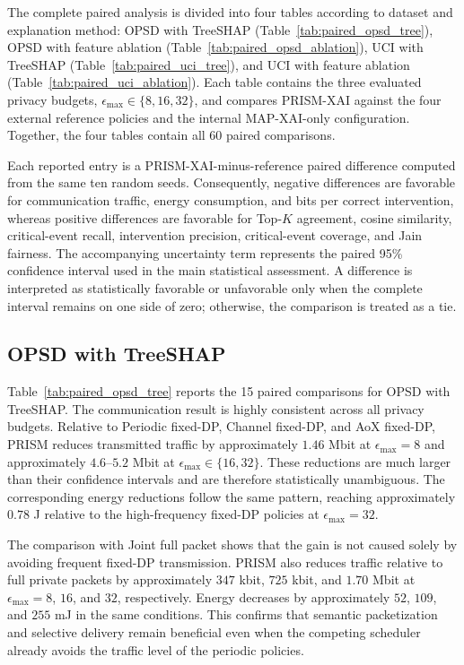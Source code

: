 \documentclass[11pt]{article}
\begin{document}
The complete paired analysis is divided into four tables according to dataset and explanation method: OPSD with TreeSHAP (Table~\ref{tab:paired_opsd_tree}), OPSD with feature ablation (Table~\ref{tab:paired_opsd_ablation}), UCI with TreeSHAP (Table~\ref{tab:paired_uci_tree}), and UCI with feature ablation (Table~\ref{tab:paired_uci_ablation}). Each table contains the three evaluated privacy budgets, $\epsilon_{\max}\in\{8,16,32\}$, and compares PRISM-XAI against the four external reference policies and the internal MAP-XAI-only configuration. Together, the four tables contain all 60 paired comparisons.

Each reported entry is a PRISM-XAI-minus-reference paired difference computed from the same ten random seeds. Consequently, negative differences are favorable for communication traffic, energy consumption, and bits per correct intervention, whereas positive differences are favorable for Top-$K$ agreement, cosine similarity, critical-event recall, intervention precision, critical-event coverage, and Jain fairness. The accompanying uncertainty term represents the paired 95\% confidence interval used in the main statistical assessment. A difference is interpreted as statistically favorable or unfavorable only when the complete interval remains on one side of zero; otherwise, the comparison is treated as a tie.

\subsection{OPSD with TreeSHAP}

Table~\ref{tab:paired_opsd_tree} reports the 15 paired comparisons for OPSD with TreeSHAP. The communication result is highly consistent across all privacy budgets. Relative to Periodic fixed-DP, Channel fixed-DP, and AoX fixed-DP, PRISM reduces transmitted traffic by approximately $1.46$ Mbit at $\epsilon_{\max}=8$ and approximately $4.6$--$5.2$ Mbit at $\epsilon_{\max}\in\{16,32\}$. These reductions are much larger than their confidence intervals and are therefore statistically unambiguous. The corresponding energy reductions follow the same pattern, reaching approximately $0.78$ J relative to the high-frequency fixed-DP policies at $\epsilon_{\max}=32$.

The comparison with Joint full packet shows that the gain is not caused solely by avoiding frequent fixed-DP transmission. PRISM also reduces traffic relative to full private packets by approximately $347$ kbit, $725$ kbit, and $1.70$ Mbit at $\epsilon_{\max}=8$, $16$, and $32$, respectively. Energy decreases by approximately $52$, $109$, and $255$ mJ in the same conditions. This confirms that semantic packetization and selective delivery remain beneficial even when the competing scheduler already avoids the traffic level of the periodic policies.
\end{document}
